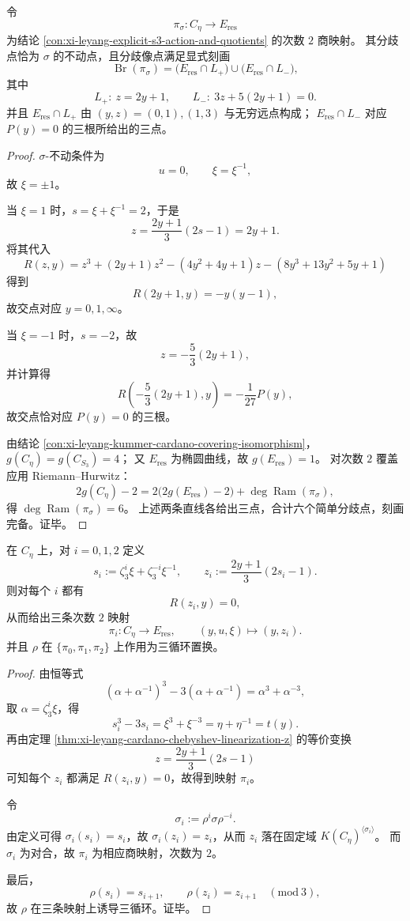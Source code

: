 \begin{conclusion}\label{con:xi-leyang-double-cover-branch-as-two-lines}
令
\[
\pi_\sigma:C_\eta\to E_{\mathrm{res}}
\]
为结论 \ref{con:xi-leyang-explicit-s3-action-and-quotients} 的次数 \(2\) 商映射。
其分歧点恰为 \(\sigma\) 的不动点，且分歧像点满足显式刻画
\[
\operatorname{Br}(\pi_\sigma)
=\bigl(E_{\mathrm{res}}\cap L_+\bigr)\cup\bigl(E_{\mathrm{res}}\cap L_-\bigr),
\]
其中
\[
L_+:\ z=2y+1,
\qquad
L_-:\ 3z+5(2y+1)=0.
\]
并且 \(E_{\mathrm{res}}\cap L_+\) 由 \((y,z)=(0,1),(1,3)\) 与无穷远点构成；
\(E_{\mathrm{res}}\cap L_-\) 对应 \(P(y)=0\) 的三根所给出的三点。
\end{conclusion}
\begin{proof}
\(\sigma\)-不动条件为
\[
u=0,\qquad \xi=\xi^{-1},
\]
故 \(\xi=\pm 1\)。

当 \(\xi=1\) 时，\(s=\xi+\xi^{-1}=2\)，于是
\[
z=\frac{2y+1}{3}(2s-1)=2y+1.
\]
将其代入
\[
R(z,y)=z^3+(2y+1)z^2-(4y^2+4y+1)z-(8y^3+13y^2+5y+1)
\]
得到
\[
R(2y+1,y)=-y(y-1),
\]
故交点对应 \(y=0,1,\infty\)。

当 \(\xi=-1\) 时，\(s=-2\)，故
\[
z=-\frac53(2y+1),
\]
并计算得
\[
R\!\left(-\frac53(2y+1),y\right)=-\frac1{27}P(y),
\]
故交点恰对应 \(P(y)=0\) 的三根。

由结论 \ref{con:xi-leyang-kummer-cardano-covering-isomorphism}，
\(
g(C_\eta)=g(C_{S_3})=4
\)；
又 \(E_{\mathrm{res}}\) 为椭圆曲线，故 \(g(E_{\mathrm{res}})=1\)。
对次数 \(2\) 覆盖应用 Riemann--Hurwitz：
\[
2g(C_\eta)-2=2\bigl(2g(E_{\mathrm{res}})-2\bigr)+\deg\operatorname{Ram}(\pi_\sigma),
\]
得 \(\deg\operatorname{Ram}(\pi_\sigma)=6\)。
上述两条直线各给出三点，合计六个简单分歧点，刻画完备。证毕。
\end{proof}

\begin{conclusion}[三个互为共轭的双椭圆商与显式公式]\label{con:xi-leyang-three-conjugate-bielliptic-quotients}
在 \(C_\eta\) 上，对 \(i=0,1,2\) 定义
\[
s_i:=\zeta_3^i\xi+\zeta_3^{-i}\xi^{-1},
\qquad
z_i:=\frac{2y+1}{3}(2s_i-1).
\]
则对每个 \(i\) 都有
\[
R(z_i,y)=0,
\]
从而给出三条次数 \(2\) 映射
\[
\pi_i:C_\eta\longrightarrow E_{\mathrm{res}},
\qquad
(y,u,\xi)\longmapsto (y,z_i).
\]
并且 \(\rho\) 在 \(\{\pi_0,\pi_1,\pi_2\}\) 上作用为三循环置换。
\end{conclusion}
\begin{proof}
由恒等式
\[
(\alpha+\alpha^{-1})^3-3(\alpha+\alpha^{-1})=\alpha^3+\alpha^{-3},
\]
取 \(\alpha=\zeta_3^i\xi\)，得
\[
s_i^3-3s_i=\xi^3+\xi^{-3}=\eta+\eta^{-1}=t(y).
\]
再由定理 \ref{thm:xi-leyang-cardano-chebyshev-linearization-z} 的等价变换
\[
z=\frac{2y+1}{3}(2s-1)
\]
可知每个 \(z_i\) 都满足 \(R(z_i,y)=0\)，故得到映射 \(\pi_i\)。

令
\[
\sigma_i:=\rho^i\sigma\rho^{-i}.
\]
由定义可得 \(\sigma_i(s_i)=s_i\)，故 \(\sigma_i(z_i)=z_i\)，从而 \(z_i\) 落在固定域
\(
K(C_\eta)^{\langle\sigma_i\rangle}
\)。
而 \(\sigma_i\) 为对合，故 \(\pi_i\) 为相应商映射，次数为 \(2\)。

最后，
\[
\rho(s_i)=s_{i+1},\qquad \rho(z_i)=z_{i+1}\quad (\mathrm{mod}\ 3),
\]
故 \(\rho\) 在三条映射上诱导三循环。证毕。
\end{proof}

